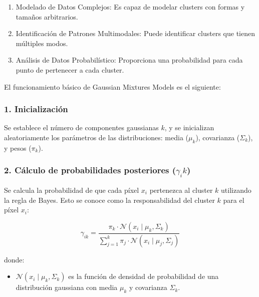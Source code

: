 \begin{enumerate}
\setlength{\itemsep}{-1ex}
   \item{\begin{flushleft} Modelado de Datos Complejos: Es capaz de modelar clusters con formas y tamaños arbitrarios. \end{flushleft}}
   \item{\begin{flushleft} Identificación de Patrones Multimodales: Puede identificar clusters que tienen múltiples modos. \end{flushleft}}
   \item{\begin{flushleft} Análisis de Datos Probabilístico: Proporciona una probabilidad para cada punto de pertenecer a cada cluster. \end{flushleft}}
\end{enumerate}

El funcionamiento básico de Gaussian Mixtures Models es el siguiente:

\subsubsection{1. Inicialización}

Se establece el número de componentes gaussianas $k$, y se inicializan aleatoriamente los parámetros de las distribuciones: media ($\mu_k$), covarianza ($\Sigma_k$), y pesos ($\pi_k$).

\subsubsection{2. Cálculo de probabilidades posteriores ($\gamma_i k$)}

Se calcula la probabilidad de que cada píxel $x_i$ pertenezca al cluster $k$ utilizando la regla de Bayes. Esto se conoce como la responsabilidad del cluster $k$ para el píxel $x_i$:

$$\gamma_{ik} =\frac{\pi_k \cdot \mathcal{N}(x_i \mid \mu_k ,\Sigma_k )}{\sum_{j=1}^k \pi_j \cdot \mathcal{N}(x_i \mid \mu_j ,\Sigma_j )}$$

donde:

\begin{itemize}
\setlength{\itemsep}{-1ex}
   \item{\begin{flushleft} $\mathcal{N}(x_i \mid \mu_k ,\Sigma_k )$ es la función de densidad de probabilidad de una distribución gaussiana con media $\mu_k$ y covarianza $\Sigma_k$. \end{flushleft}}
\end{itemize}

